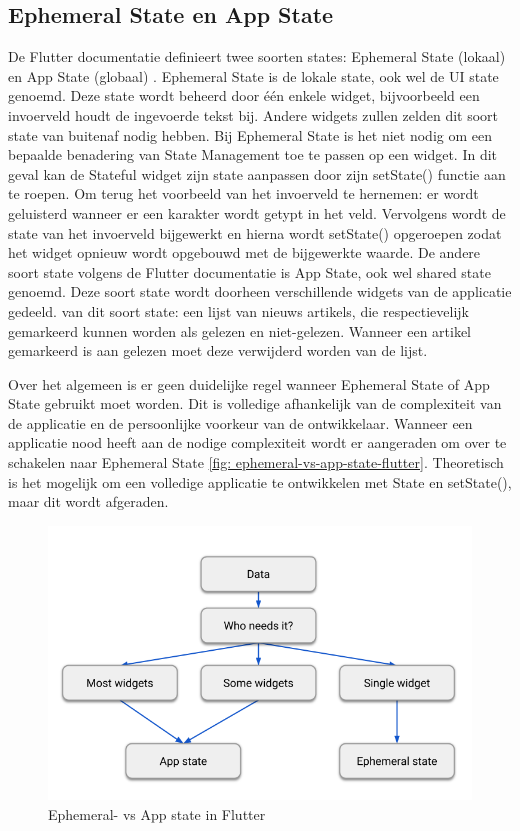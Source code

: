 \subsection{Ephemeral State en App State}
De Flutter documentatie definieert twee soorten states: Ephemeral State (lokaal) en App State (globaal) \autocite{Developers2019}.
Ephemeral State is de lokale state, ook wel de UI state genoemd. Deze state wordt beheerd door één enkele widget, bijvoorbeeld een invoerveld houdt de ingevoerde tekst bij. Andere widgets zullen zelden dit soort state van buitenaf nodig hebben. Bij Ephemeral State is het niet nodig om een bepaalde benadering van State Management toe te passen op een widget. In dit geval kan de Stateful widget zijn state aanpassen door zijn setState() functie aan te roepen.
Om terug het voorbeeld van het invoerveld te hernemen: er wordt geluisterd wanneer er een karakter wordt getypt in het veld. Vervolgens wordt de state van het invoerveld bijgewerkt en hierna wordt setState() opgeroepen zodat het widget opnieuw wordt opgebouwd met de bijgewerkte waarde.
\newline
De andere soort state volgens de Flutter documentatie \autocite{Developers2019} is App State, ook wel shared state genoemd. Deze soort state wordt doorheen verschillende widgets van de applicatie gedeeld.
 van dit soort state: een lijst van nieuws artikels, die respectievelijk gemarkeerd kunnen worden als gelezen en niet-gelezen. Wanneer een artikel gemarkeerd is aan gelezen moet deze verwijderd worden van de lijst. 
\newline

Over het algemeen is er geen duidelijke regel wanneer Ephemeral State of App State gebruikt moet worden. Dit is volledige afhankelijk van de complexiteit van de applicatie en de persoonlijke voorkeur van de ontwikkelaar.
Wanneer een applicatie nood heeft aan de nodige complexiteit wordt er aangeraden om over te schakelen naar Ephemeral State \ref{fig: ephemeral-vs-app-state-flutter}. Theoretisch is het mogelijk om een volledige applicatie te ontwikkelen met State en setState(), maar dit wordt afgeraden.
\begin{figure}[H]
    \includegraphics[width=\linewidth]{img/stand-van-zaken/ephemeral-vs-app-state-flutter.png}
    \caption{Ephemeral- vs App state in Flutter}
    \label{fig:ephemeral-vs-app-state-flutter}
\end{figure}


